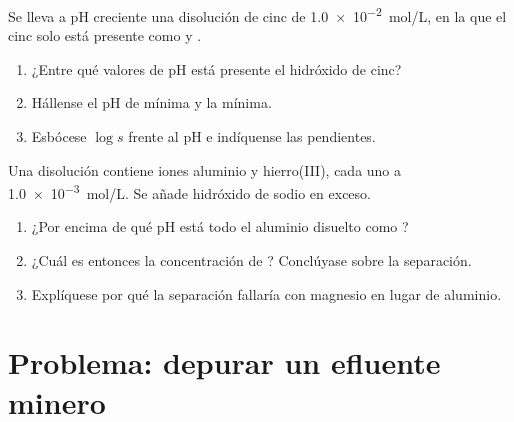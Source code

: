 \begin{exercise}[$\star\star\star$]\label{exo:b1:precipitation:11}
Se lleva a pH creciente una disolución de cinc de \qty{1.0e-2}{mol/L}, en
la que el cinc solo está presente como  y .
\begin{enumerate}
  \item ¿Entre qué valores de pH está presente el hidróxido de cinc?
  \item Hállense el pH de  mínima y la  mínima.
  \item Esbócese $\log s$ frente al pH e indíquense las pendientes.
\end{enumerate}
\end{exercise}

\begin{exercise}[$\star\star\star$]\label{exo:b1:precipitation:12}
Una disolución contiene iones aluminio y hierro(III), cada uno a
\qty{1.0e-3}{mol/L}. Se añade hidróxido de sodio en exceso.
\begin{enumerate}
  \item ¿Por encima de qué pH está todo el aluminio disuelto como
        ?
  \item ¿Cuál es entonces la concentración de ? Conclúyase sobre
        la separación.
  \item Explíquese por qué la separación fallaría con magnesio en lugar de
        aluminio.
\end{enumerate}
\end{exercise}

\section{Problema: depurar un efluente minero}

